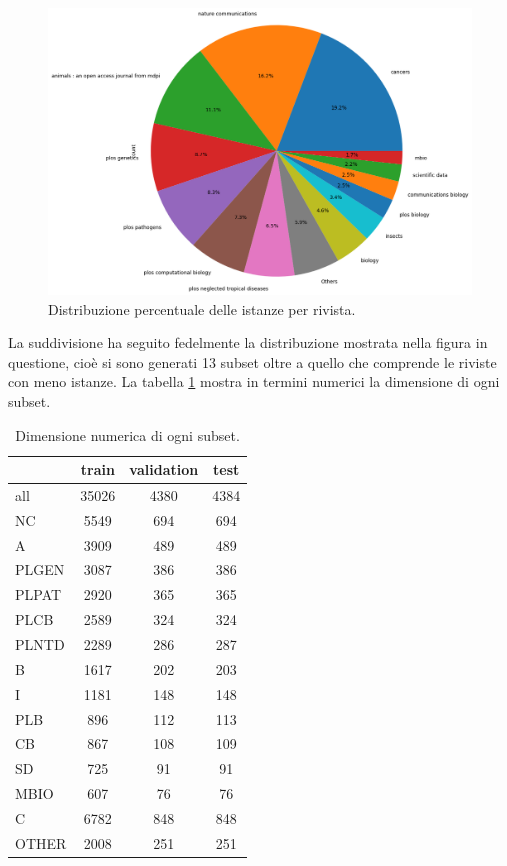 \documentclass[12pt,a4paper,twoside,openright]{book}
\begin{document}
\begin{figure}
    \centering
    \includegraphics[width=\textwidth]{images/journal_instances_percentage.png}
    \caption{Distribuzione percentuale delle istanze per rivista.}
    \label{fig:journal-inst-perc}
\end{figure}


La suddivisione ha seguito fedelmente la distribuzione mostrata nella figura in questione, cioè si sono generati 13 subset oltre a quello che comprende le riviste con meno istanze. 
La tabella \ref{tab:split-journals} mostra in termini numerici la dimensione di ogni subset.

\begin{table}
\centering
\begin{tabular}{|l|c|c|c|}
\hline
       & train & validation & test \\
\hline
all    & 35026 & 4380       & 4384 \\
NC     & 5549  & 694        & 694  \\
A      & 3909  & 489        & 489  \\
PLGEN  & 3087  & 386        & 386  \\
PLPAT  & 2920  & 365        & 365  \\
PLCB   & 2589  & 324        & 324  \\
PLNTD  & 2289  & 286        & 287  \\
B      & 1617  & 202        & 203  \\
I      & 1181  & 148        & 148  \\
PLB    & 896   & 112        & 113  \\
CB     & 867   & 108        & 109  \\
SD     & 725   & 91         & 91   \\
MBIO   & 607   & 76         & 76   \\
C      & 6782  & 848        & 848  \\
OTHER  & 2008  & 251        & 251  \\
\hline
\end{tabular}
\caption{Dimensione numerica di ogni subset.}
\label{tab:split-journals}
\end{table}
\end{document}
